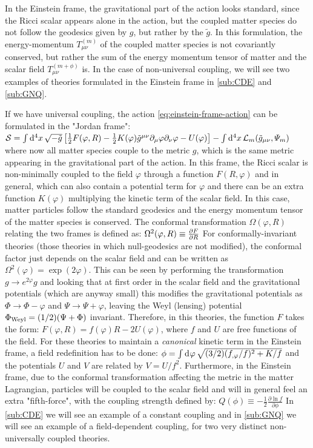 In the Einstein frame, the gravitational part of the action looks standard, since the Ricci scalar appears alone in the action,
but the coupled matter species do not follow the geodesics given by $g$, but rather by the $\tilde g$. 
In this formulation, the energy-momentum $T^{(m)}_{\mu \nu}$ of the coupled matter species is not covariantly conserved, but rather
the sum of the energy momentum tensor of matter and the scalar field $T^{(m+\phi)}_{\mu \nu}$ is.
In the case of non-universal coupling, we will see two examples of theories formulated in the Einstein frame in \cref{sub:CDE} and \cref{sub:GNQ}.

If we have universal coupling, the action \cref{eq:einstein-frame-action} can be formulated in the "Jordan frame":
\beeqc$\label{eq:jordan-frame-action}
\mathcal{S} = \int \mathrm{d}^{4} {x} \, \sqrt{-\tilde{g}} \left[  \frac{1}{2} F(\varphi, R) - \frac{1}{2} K(\varphi) \tilde{g}^{\mu \nu}  \partial_{\mu}\varphi \partial_{\nu}\varphi 
- U(\varphi)    \right] - \int \mathrm{d}^{4} {x} \, \mathcal{L}_m (\tilde{g}_{\mu \nu} , \varPsi_m )
$
where now all matter species couple to the metric $g$, which is the same metric appearing in the gravitational part of the action.
In this frame, the Ricci scalar is non-minimally coupled to the field $\varphi$ through a function $F(R, \varphi)$ and in general, 
which can also contain a potential term for $\varphi$ and there can be an extra function $K(\varphi)$ multiplying the kinetic term of the scalar field.
In this case, matter particles follow the standard geodesics and the energy momentum tensor of the matter species is conserved.
The conformal transformation $\Omega(\varphi,R)$ relating the two frames is defined as:
\beeqp$
\Omega^2(\varphi,R) \equiv \frac{\partial{F}}{\partial{R}} 
$
For conformally-invariant theories (those theories in which null-geodesics are not modified), the conformal factor
just depends on the scalar field and can be written as $\Omega^2(\varphi)=\exp(2\varphi)$. 
This can be seen by performing the transformation $g \rightarrow e^{2\varphi} g$ and 
looking that at first order in the
scalar field and the gravitational potentials (which are anyway small)
this modifies the gravitational potentials as $\Phi \rightarrow \Phi-\varphi$ and $\Psi \rightarrow \Psi+\varphi$, leaving 
the Weyl (lensing) potential $\Phi_{\rm Weyl} = (1/2)(\Psi + \Phi)$ invariant.
Therefore, in this theories, the function $F$ takes the form: $F(\varphi, R) = f(\varphi)R-2U(\varphi)$, where
$f$ and $U$ are free functions of the field.
For these theories to maintain a \emph{canonical} kinetic term in the Einstein frame, a field redefinition has to be done:
\beeq$
\phi = \int \mathrm{d}^{} {\varphi} \, \sqrt{(3/2)(f_{,\varphi}/f)^2 + K/f}
$
and the potentials $U$ and $V$ are related by $V = U/f^2$.
Furthermore, in the Einstein frame, due to the conformal transformation affecting the metric in the matter Lagrangian,
particles will be coupled to the scalar field and will in general feel an extra "fifth-force", with the coupling strength
defined by:
\beeqp$
Q(\phi) \equiv -\frac{1}{2}\frac{\partial \ln f}{\partial \phi}
$
In \cref{sub:CDE} we will see an example of a constant coupling and in \cref{sub:GNQ} we will see an example of a field-dependent coupling, 
for two very distinct non-universally coupled theories.

